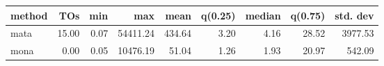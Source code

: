 \begin{tabular}{lrrrrrrrr}
\hline
 method   &   TOs &   min &      max &   mean &   q(0.25) &   median &   q(0.75) &   std. dev \\
\hline
 mata     & 15.00 &  0.07 & 54411.24 & 434.64 &      3.20 &     4.16 &     28.52 &    3977.53 \\
 mona     &  0.00 &  0.05 & 10476.19 &  51.04 &      1.26 &     1.93 &     20.97 &     542.09 \\
\hline
\end{tabular}
